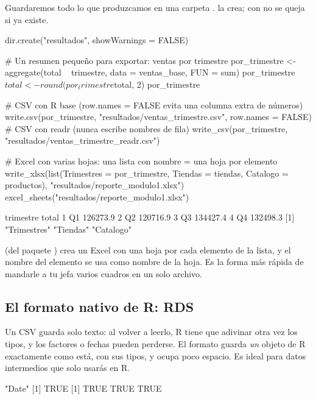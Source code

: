 Guardaremos todo lo que produzcamos en una carpeta .
 la crea; con  no se queja
si ya existe.

\begin{rcode}
dir.create("resultados", showWarnings = FALSE)

# Un resumen pequeño para exportar: ventas por trimestre
por_trimestre <- aggregate(total ~ trimestre, data = ventas_base, FUN = sum)
por_trimestre$total <- round(por_trimestre$total, 2)
por_trimestre

# CSV con R base (row.names = FALSE evita una columna extra de números)
write.csv(por_trimestre, "resultados/ventas_trimestre.csv",
          row.names = FALSE)
# CSV con readr (nunca escribe nombres de fila)
write_csv(por_trimestre, "resultados/ventas_trimestre_readr.csv")

# Excel con varias hojas: una lista con nombre = una hoja por elemento
write_xlsx(list(Trimestres = por_trimestre,
                Tiendas = tiendas,
                Catalogo = productos),
           "resultados/reporte_modulo1.xlsx")
excel_sheets("resultados/reporte_modulo1.xlsx")
\end{rcode}
\begin{rsalida}
  trimestre    total
1        Q1 126273.9
2        Q2 120716.9
3        Q3 134427.4
4        Q4 132498.3
[1] "Trimestres" "Tiendas"    "Catalogo"  
\end{rsalida}

 (del paquete ) crea un Excel con
una hoja por cada elemento de la lista, y el nombre del elemento se usa
como nombre de la hoja. Es la forma más rápida de mandarle a tu jefa
varios cuadros en un solo archivo.

\subsection{El formato nativo de R: RDS}

Un CSV guarda solo texto: al volver a leerlo, R tiene que adivinar otra vez
los tipos, y los factores o fechas pueden perderse. El formato
 guarda \emph{un} objeto de R exactamente como está, con sus
tipos, y ocupa poco espacio. Es ideal para datos intermedios que solo
usarás en R.

\begin{rsalida}
[1] "Date"
[1] TRUE
[1] TRUE TRUE TRUE
\end{rsalida}

